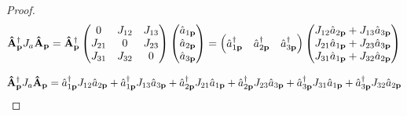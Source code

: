 \documentclass[letterpaper]{article}
\theoremstyle{definition}
\begin{document}
\begin{proof}
  \[\vb{\hat{A}}^\dagger_{\vb{p}}J_a\vb{\hat{A}}_{\vb{p}}=\vb{\hat{A}}^\dagger_{\vb{p}}\begin{pmatrix}
      0      & J_{12} & J_{13} \\
      J_{21} & 0      & J_{23} \\
      J_{31} & J_{32} & 0      \\
    \end{pmatrix}\begin{pmatrix}
      \hat{a}_{1\vb{p}} \\
      \hat{a}_{2\vb{p}} \\
      \hat{a}_{3\vb{p}} \\
    \end{pmatrix}=\begin{pmatrix}
      \hat{a}^\dagger_{1\vb{p}} &
      \hat{a}^\dagger_{2\vb{p}} &
      \hat{a}^\dagger_{3\vb{p}}
    \end{pmatrix}\begin{pmatrix}
      J_{12}\hat{a}_{2\vb{p}} + J_{13}\hat{a}_{3\vb{p}} \\
      J_{21}\hat{a}_{1\vb{p}} + J_{23}\hat{a}_{3\vb{p}} \\
      J_{31}\hat{a}_{1\vb{p}} + J_{32}\hat{a}_{2\vb{p}} \\
    \end{pmatrix}\]

  \begin{align*}
    \vb{\hat{A}}^\dagger_{\vb{p}}J_a\vb{\hat{A}}_{\vb{p}} & =
    \hat{a}^\dagger_{1\vb{p}}J_{12}\hat{a}_{2\vb{p}} + \hat{a}^\dagger_{1\vb{p}}J_{13}\hat{a}_{3\vb{p}}
    +\hat{a}^\dagger_{2\vb{p}}J_{21}\hat{a}_{1\vb{p}} + \hat{a}^\dagger_{2\vb{p}}J_{23}\hat{a}_{3\vb{p}}
    +\hat{a}^\dagger_{3\vb{p}}J_{31}\hat{a}_{1\vb{p}} + \hat{a}^\dagger_{3\vb{p}}J_{32}\hat{a}_{2\vb{p}} \\
  \end{align*}


\end{proof}
\end{document}
